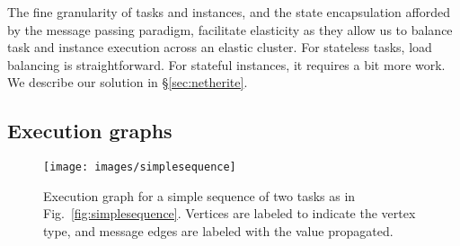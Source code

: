 %
%
The fine granularity of tasks and instances, and the state encapsulation afforded by the message passing paradigm, facilitate elasticity as they allow us to balance task and instance execution across an elastic cluster. For stateless tasks, load balancing is straightforward. For stateful instances, it requires a bit more work. We describe our solution in \S\ref{sec:netherite}. 


\subsection{Execution graphs}

\begin{figure}
    \centering
    \texttt{[image: images/simplesequence]}
    \caption{Execution graph for a simple sequence of two tasks as in Fig.~\ref{fig:simplesequence}. Vertices are labeled to indicate the vertex type, and message edges are labeled with the value propagated.}
    \label{fig:ss-graph}
\end{figure}

